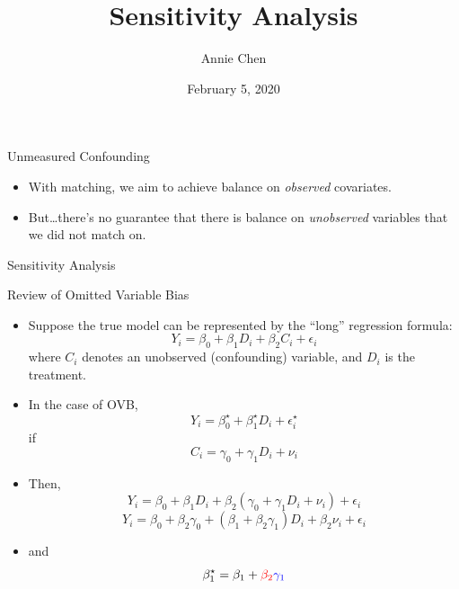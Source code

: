 \documentclass[ignorenonframetext,]{beamer}
\title{Sensitivity Analysis}
\author{Annie Chen}
\date{February 5, 2020}
\begin{document}
\frame{\titlepage}

\begin{frame}{Unmeasured Confounding}

\begin{itemize}
\item
  With matching, we aim to achieve balance on \emph{observed}
  covariates.
\item
  But\ldots{}there's no guarantee that there is balance on
  \emph{unobserved} variables that we did not match on.
\end{itemize}

\end{frame}

\begin{frame}{Sensitivity Analysis}


\end{frame}

\begin{frame}{Review of Omitted Variable Bias}

\begin{itemize}
\item
  Suppose the true model can be represented by the ``long'' regression
  formula: \[Y_i = \beta_0 + \beta_1 D_i + \beta_2 C_i + \epsilon_i\]
  where \(C_i\) denotes an unobserved (confounding) variable, and
  \(D_i\) is the treatment.
\item
  In the case of OVB,
  \[Y_i = \beta^{\star}_0 + \beta^{\star}_1 D_i + \epsilon^{\star}_i\]
  if \[C_i = \gamma_0 + \gamma_1 D_i + \nu_i\]
\item
  Then,
  \[Y_i = \beta_0 + \beta_1 D_i + \beta_2 (\gamma_0 + \gamma_1 D_i + \nu_i) + \epsilon_i\]
  \[Y_i = \beta_0 + \beta_2\gamma_0 + (\beta_1 + \beta_2 \gamma_1)D_i  + \beta_2\nu_i + \epsilon_i\]
\item
  and
  \[\beta^{\star}_1 = \beta_1 + \color{red}{\beta_2} \color{blue}{\gamma_1}\]
\end{itemize}

\end{frame}
\end{document}
